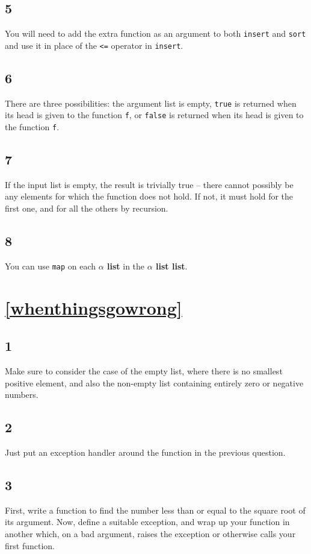 \documentclass[]{book}
\begin{document}
\subsection*{5}
You will need to add the extra function as an argument to both \texttt{insert} and \texttt{sort} and use it in place of the \texttt{<=} operator in \texttt{insert}.

\subsection*{6}
There are three possibilities: the argument list is empty, \texttt{true} is returned when its head is given to the function \texttt{f}, or \texttt{false} is returned when its head is given to the function \texttt{f}.

\subsection*{7}
If the input list is empty, the result is trivially true -- there cannot possibly be any elements for which the function does not hold. If not, it must hold for the first one, and for all the others by recursion. 

\subsection*{8}
You can use \texttt{map} on each \textbf{\textrm{$\alpha$ list}} in the \textbf{\textrm{$\alpha$ list list}}.

\section*{\ref{whenthingsgowrong}\\ }

\subsection*{1}
Make sure to consider the case of the empty list, where there is no smallest positive element, and also the non-empty list containing entirely zero or negative numbers.

\subsection*{2}
Just put an exception handler around the function in the previous question.

\subsection*{3}
First, write a function to find the number less than or equal to the square root of its argument. Now, define a suitable exception, and wrap up your function in another which, on a bad argument, raises the exception or otherwise calls your first function.
\end{document}
